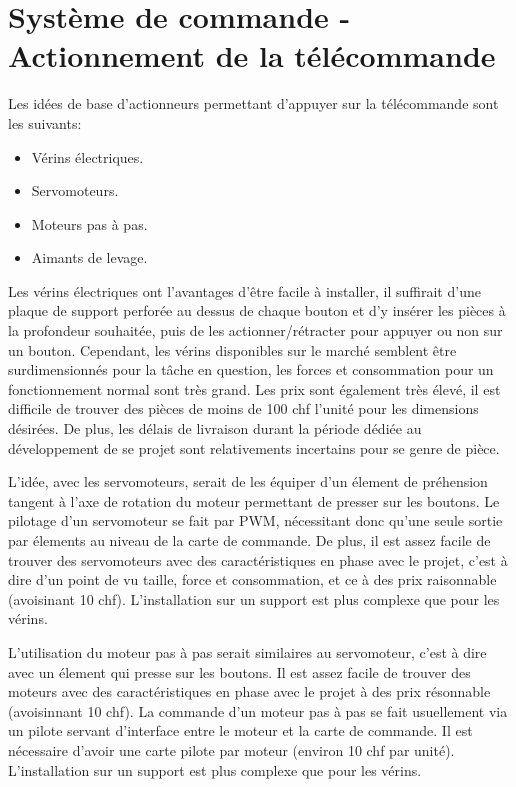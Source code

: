 \newpage
\section{Système de commande - Actionnement de la télécommande}
Les idées de base d'actionneurs permettant d'appuyer sur la télécommande sont les suivants:
\begin{itemize}
    \item Vérins électriques.
    \item Servomoteurs.
    \item Moteurs pas à pas.
    \item Aimants de levage.
\end{itemize}

Les vérins électriques ont l'avantages d'être facile à installer, il suffirait d'une plaque de support perforée au dessus de chaque bouton et d'y insérer
les pièces à la profondeur souhaitée, puis de les actionner/rétracter pour appuyer ou non sur un bouton. Cependant, les vérins disponibles sur le marché semblent être surdimensionnés pour la tâche en question, les forces et
consommation pour un fonctionnement normal sont très grand. Les prix sont également très élevé, il est difficile de trouver des pièces de moins de 100 \Gls{chf} l'unité
pour les dimensions désirées. De plus, les délais de livraison durant la période dédiée au développement de se projet sont relativements incertains pour se genre de pièce.

L'idée, avec les servomoteurs, serait de les équiper d'un élement de préhension tangent à l'axe de rotation du moteur permettant de presser sur les boutons.
Le pilotage d'un servomoteur se fait par PWM, nécessitant donc qu'une seule sortie par élements au niveau de la carte de commande. De plus, il est assez facile de
trouver des servomoteurs avec des caractéristiques en phase avec le projet, c'est à dire d'un point de vu taille, force et consommation, et ce à des prix
raisonnable (avoisinant 10 \Gls{chf}). L'installation sur un support est plus complexe que pour les vérins.

L'utilisation du moteur pas à pas serait similaires au servomoteur, c'est à dire avec un élement qui presse sur les boutons.
Il est assez facile de trouver des moteurs avec des caractéristiques en phase avec le projet à des prix résonnable (avoisinnant 10 \Gls{chf}). La commande d'un moteur pas à pas
se fait usuellement via un pilote servant d'interface entre le moteur et la carte de commande. Il est nécessaire d'avoir une carte pilote par moteur (environ 10 \Gls{chf} par unité).
L'installation sur un support est plus complexe que pour les vérins.

